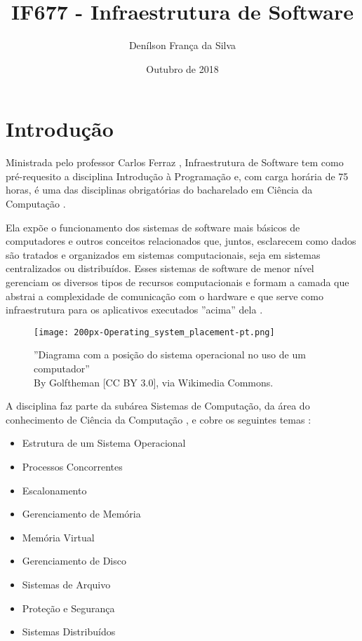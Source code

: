 \documentclass[10pt]{article}
\title{IF677 - Infraestrutura de Software}
\author{Denílson França da Silva}
\date{Outubro de 2018}
\begin{document}
\maketitle
\section{Introdução}

	Ministrada pelo professor Carlos Ferraz \cite{horarios}\cite{cinwiki-infrasoft}, Infraestrutura de Software tem como pré-requesito a disciplina Introdução à Programação e, com carga horária de 75 horas, é uma das disciplinas obrigatórias do bacharelado em Ciência da Computação \cite{perfilcurricular}.
		
	Ela expõe o funcionamento dos sistemas de software mais básicos de computadores e outros conceitos relacionados que, juntos, esclarecem como dados são tratados e organizados em sistemas computacionais, seja em sistemas centralizados ou distribuídos. Esses sistemas de software de menor nível gerenciam os diversos tipos de recursos computacionais e formam a camada que abstrai a complexidade de comunicação com o hardware e que serve como infraestrutura para os aplicativos executados ''acima'' dela \cite{cinwiki-infrasoft}\cite{anotacoes}.
	
	\begin{figure}[h]
	\centering
	\captionsetup{justification=centering}
	\texttt{[image: 200px-Operating\_system\_placement-pt.png]}
	\caption{''Diagrama com a posição do sistema operacional no uso de um computador'' \\ By Golftheman [CC BY 3.0], via Wikimedia Commons. \cite{diagrama}}
	\label{fig:diagramaSO}
	\end{figure}
	
	A disciplina faz parte da subárea Sistemas de Computação, da área do conhecimento de Ciência da Computação \cite{cnpq-areas}, e cobre os seguintes temas \cite{perfilcurricular}:

	\begin{multicols}{2}
	\begin{itemize}
	\item Estrutura de um Sistema Operacional
	\item Processos Concorrentes
	\item Escalonamento
	\item Gerenciamento de Memória
	\item Memória Virtual
	\item Gerenciamento de Disco
	\item Sistemas de Arquivo
	\item Proteção e Segurança
	\item Sistemas Distribuídos
	\end{itemize}
	\end{multicols}
\end{document}
